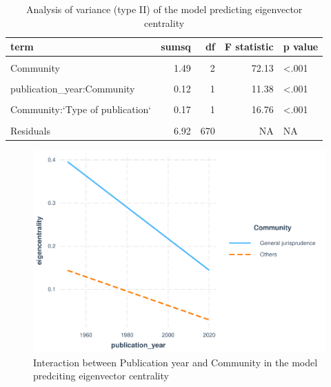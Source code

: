\documentclass[
]{article}
\begin{document}
\begin{table}[!h]

\caption{\label{tab:anova}Analysis of variance (type II) of the model predicting eigenvector centrality}
\centering
\fontsize{8}{10}\selectfont
\begin{tabular}[t]{lrrrl}
\toprule
term & sumsq & df & F statistic & p value\\
\midrule
\cellcolor{gray!6}{publication\_year} & \cellcolor{gray!6}{0.48} & \cellcolor{gray!6}{1} & \cellcolor{gray!6}{46.32} & \cellcolor{gray!6}{<.001}\\
Community & 1.49 & 2 & 72.13 & <.001\\
\cellcolor{gray!6}{`Type of publication`} & \cellcolor{gray!6}{0.51} & \cellcolor{gray!6}{2} & \cellcolor{gray!6}{24.78} & \cellcolor{gray!6}{<.001}\\
publication\_year:Community & 0.12 & 1 & 11.38 & <.001\\
\cellcolor{gray!6}{publication\_year:`Type of publication`} & \cellcolor{gray!6}{0.00} & \cellcolor{gray!6}{1} & \cellcolor{gray!6}{0.08} & \cellcolor{gray!6}{0.779}\\
\addlinespace
Community:`Type of publication` & 0.17 & 1 & 16.76 & <.001\\
\cellcolor{gray!6}{publication\_year:Community:`Type of publication`} & \cellcolor{gray!6}{0.00} & \cellcolor{gray!6}{1} & \cellcolor{gray!6}{0.06} & \cellcolor{gray!6}{0.801}\\
Residuals & 6.92 & 670 & NA & NA\\
\bottomrule
\end{tabular}
\end{table}

\begin{figure}
\centering
\includegraphics{paper_files/figure-latex/inter1-1.pdf}
\caption{\label{fig:inter1}Interaction between Publication year and Community in the model predciting eigenvector centrality}
\end{figure}
\end{document}
